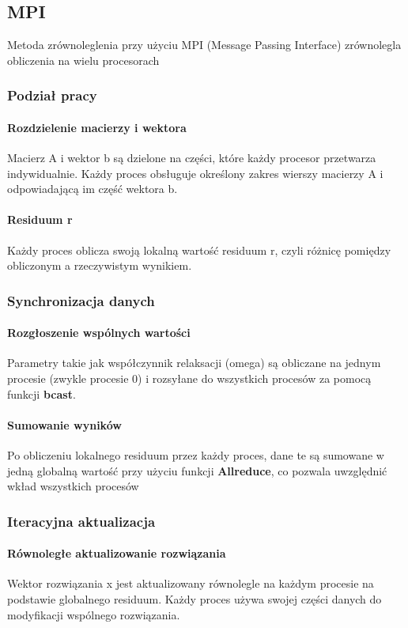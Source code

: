 \subsection{MPI}
Metoda zrównoleglenia przy użyciu MPI (Message Passing Interface) zrównolegla obliczenia na wielu procesorach
\subsubsection{Podział pracy}
\paragraph{Rozdzielenie macierzy i wektora}
Macierz A i wektor b są dzielone na części, które każdy procesor przetwarza indywidualnie. Każdy proces obsługuje określony zakres wierszy macierzy A i odpowiadającą im część wektora b.
\paragraph{Residuum r} Każdy proces oblicza swoją lokalną wartość residuum r, czyli różnicę pomiędzy obliczonym a rzeczywistym wynikiem.

\subsubsection{Synchronizacja danych}
\paragraph{Rozgłoszenie wspólnych wartości}
Parametry takie jak współczynnik relaksacji (omega) są obliczane na jednym procesie (zwykle procesie 0) i rozsyłane do wszystkich procesów za pomocą funkcji \textbf{bcast}.

\paragraph{Sumowanie wyników} Po obliczeniu lokalnego residuum przez każdy proces, dane te są sumowane w jedną globalną wartość przy użyciu funkcji \textbf{Allreduce}, co pozwala uwzględnić wkład wszystkich procesów

\subsubsection{Iteracyjna aktualizacja}
\paragraph{Równoległe aktualizowanie rozwiązania}
Wektor rozwiązania x jest aktualizowany równolegle na każdym procesie na podstawie globalnego residuum. Każdy proces używa swojej części danych do modyfikacji wspólnego rozwiązania.

